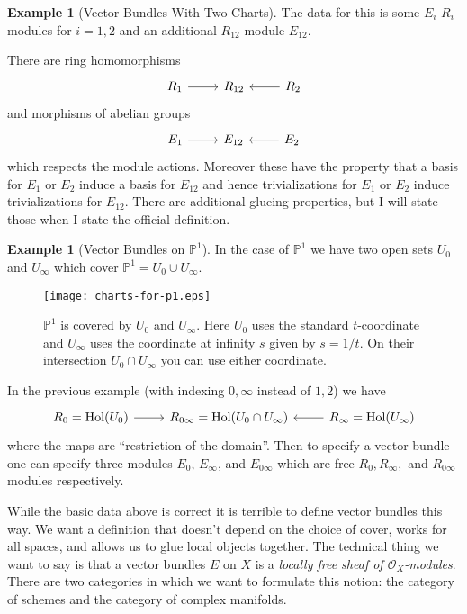 \documentclass[12pt]{book}
\numberwithin{equation}{section}
\theoremstyle{definition}
\newtheorem{example}[theorem]{Example}
\theoremstyle{remark}
\newcommand{\PP}{\mathbb{P}}
\newcommand{\Ocal}{\mathcal{O}}
\newcommand{\hol}{\operatorname{Hol}}
\begin{document}
\begin{example}[Vector Bundles With Two Charts]
	The data for this is some $E_i$ $R_i$-modules for $i=1,2$ and an additional $R_{12}$-module $E_{12}$.
	
	There are ring homomorphisms 
	$$ \begin{tikzcd}
	R_1 \arrow[r] & R_{12} & \arrow[l] R_2 
	\end{tikzcd}$$
	and morphisms of abelian groups
	$$ \begin{tikzcd}
	E_1 \arrow[r] & E_{12} & \arrow[l] E_2 
	\end{tikzcd}$$
	which respects the module actions. 
	Moreover these have the property that a basis for $E_1$ or $E_2$ induce a basis for $E_{12}$ and hence trivializations for $E_1$ or $E_2$ induce trivializations for $E_{12}$. 
	There are additional glueing properties, but I will state those when I state the official definition.
\end{example}

\begin{example}[Vector Bundles on $\PP^1$]\label{E:charts-on-p1}
	In the case of $\PP^1$ we have two open sets $U_0$ and $U_{\infty}$ which cover $\PP^1 = U_0 \cup U_{\infty}$. 
	\begin{figure}[h]
		\begin{center}
			\texttt{[image: charts-for-p1.eps]}
		\end{center}
		\caption{$\PP^1$ is covered by $U_0$ and $U_{\infty}$.
			Here $U_0$ uses the standard $t$-coordinate and  $U_{\infty}$ uses the coordinate at infinity $s$ given by $s=1/t$. 
			On their intersection $U_0 \cap U_{\infty}$ you can use either coordinate. 
		}
	\end{figure}
	
	In the previous example (with indexing $0,\infty$ instead of $1,2$) we have 
	$$ \begin{tikzcd}
	R_0 =\hol(U_0) \arrow[r] & R_{0\infty} = \hol(U_0\cap U_{\infty}) & \arrow[l] R_{\infty} = \hol(U_{\infty}) 
	\end{tikzcd}$$
	where the maps are ``restriction of the domain''.
	Then to specify a vector bundle one can specify three modules $E_0$, $E_{\infty}$, and $E_{0\infty}$ which are free $R_0,R_{\infty},$ and $R_{0\infty}$-modules respectively. 
\end{example}

While the basic data above is correct it is terrible to define vector bundles this way. 
We want a definition that doesn't depend on the choice of cover, works for all spaces, and allows us to glue local objects together. 
The technical thing we want to say is that a vector bundles $E$ on $X$ is a \emph{locally free sheaf of $\Ocal_X$-modules}.
There are two categories in which we want to formulate this notion: the category of schemes and the category of complex manifolds. 
\end{document}
